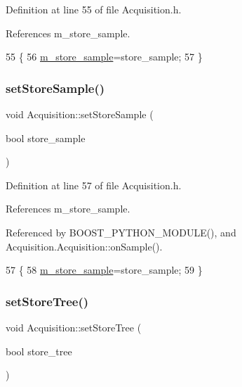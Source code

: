 Definition at line 55 of file Acquisition.\+h.



References m\+\_\+store\+\_\+sample.


\begin{DoxyCode}
55                                         \{
56     \hyperlink{classAcquisition_a987cc1d04007cf1f5acc1accfd0909e5}{m\_store\_sample}=store\_sample;
57   \}
\end{DoxyCode}
\mbox{\label{classAcquisition_af36a1b660244096b7d274f591f67b695}} 
\subsubsection{\texorpdfstring{set\+Store\+Sample()}{setStoreSample()}\hspace{0.1cm}{\footnotesize\ttfamily [2/2]}}
{\footnotesize\ttfamily void Acquisition\+::set\+Store\+Sample (\begin{DoxyParamCaption}\item[{bool}]{store\+\_\+sample }\end{DoxyParamCaption})\hspace{0.3cm}{\ttfamily [inline]}}



Definition at line 57 of file Acquisition.\+h.



References m\+\_\+store\+\_\+sample.



Referenced by B\+O\+O\+S\+T\+\_\+\+P\+Y\+T\+H\+O\+N\+\_\+\+M\+O\+D\+U\+L\+E(), and Acquisition.\+Acquisition\+::on\+Sample().


\begin{DoxyCode}
57                                         \{
58     \hyperlink{classAcquisition_a987cc1d04007cf1f5acc1accfd0909e5}{m\_store\_sample}=store\_sample;
59   \}
\end{DoxyCode}
\mbox{\label{classAcquisition_a759193856d26354722e5f647e60e16de}} 
\subsubsection{\texorpdfstring{set\+Store\+Tree()}{setStoreTree()}\hspace{0.1cm}{\footnotesize\ttfamily [1/2]}}
{\footnotesize\ttfamily void Acquisition\+::set\+Store\+Tree (\begin{DoxyParamCaption}\item[{bool}]{store\+\_\+tree }\end{DoxyParamCaption})\hspace{0.3cm}{\ttfamily [inline]}}



